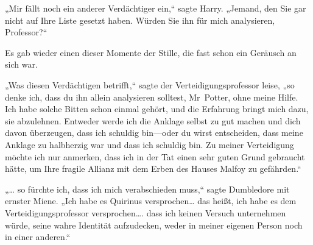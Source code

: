 „Mir fällt noch ein anderer Verdächtiger ein,“ sagte Harry. „Jemand, den Sie gar nicht auf Ihre Liste gesetzt haben. Würden Sie ihn für mich analysieren, Professor?“

Es gab wieder einen dieser Momente der Stille, die fast schon ein Geräusch an sich war.

„Was diesen Verdächtigen betrifft,“ sagte der Verteidigungsprofessor leise, „so denke ich, dass du ihn allein analysieren solltest, Mr~Potter, ohne meine Hilfe. Ich habe solche Bitten schon einmal gehört, und die Erfahrung bringt mich dazu, sie abzulehnen. Entweder werde ich die Anklage selbst zu gut machen und dich davon überzeugen, dass ich schuldig bin—oder du wirst entscheiden, dass meine Anklage zu halbherzig war und dass ich schuldig bin. Zu meiner Verteidigung möchte ich nur anmerken, dass ich in der Tat einen sehr guten Grund gebraucht hätte, um Ihre fragile Allianz mit dem Erben des Hauses Malfoy zu gefährden.“


„… so fürchte ich, dass ich mich verabschieden muss,“ sagte Dumbledore mit ernster Miene. „Ich habe es Quirinus versprochen… das heißt, ich habe es dem Verteidigungsprofessor versprochen…. dass ich keinen Versuch unternehmen würde, seine wahre Identität aufzudecken, weder in meiner eigenen Person noch in einer anderen.“

